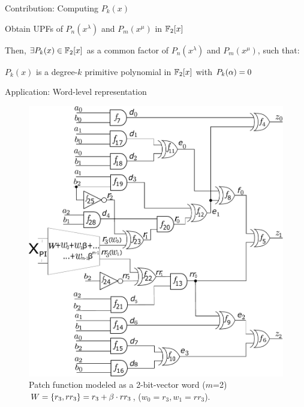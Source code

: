 \begin{frame}{\large Contribution: Computing $P_k(x)$}
\bi
	\item Obtain UPFs of $P_n(x^{\lambda})$ and $P_m(x^{\mu})$ in ${\mathbb{F}}_2[x]$
	\vspace{0.1in}
	\item Then, $\exists P_{k}(x) \in {\mathbb{F}}_2[x]$ as a common factor of $P_n(x^{\lambda})$ and $P_m(x^{\mu})$, such that:
	\bi
		\item $P_{k}(x)$ is a degree-$k$ primitive polynomial in ${\mathbb{F}}_2[x]$ with $P_k(\alpha)=0$
	\ei
\ei
\end{frame}

\begin{frame}{\large Application: Word-level representation}
\begin{figure}[hbt]
\centering
    \includegraphics[scale = 0.24]{mas_3_ddc_mfr_b.pdf}
    \caption*{
    Patch function modeled as a 2-bit-vector word ($m$=2) $W=\{r_3,rr_3\} = r_3+\beta\cdot rr_3$, ($w_0=r_3, w_1=rr_3$).}
    \label{fig:mas_bug_Wb}
\end{figure}
\end{frame}

